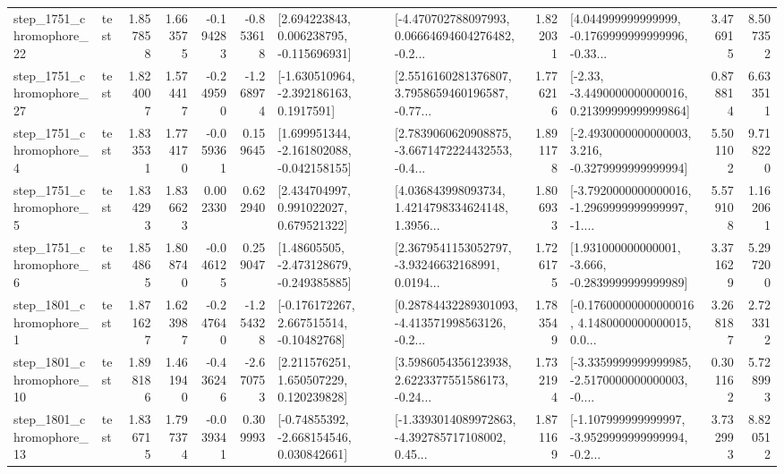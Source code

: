 \begin{tabular}{llrrrrllrlrr}
 step\_1751\_chromophore\_22 &      test &      1.857858 &    1.663575 &     -0.194283 & -0.853618 &    [2.694223843, 0.006238795, -0.115696931] &  [-4.470702788097993, 0.06664694604276482, -0.2... &       1.822031 &  [4.044999999999999, -0.1769999999999996, -0.33... &            3.476915 &          8.507352 \\
 step\_1751\_chromophore\_27 &      test &      1.824007 &    1.574417 &     -0.249590 & -1.268974 &     [-1.630510964, -2.392186163, 0.1917591] &  [2.5516160281376807, 3.7958659460196587, -0.77... &       1.776216 &  [-2.33, -3.4490000000000016, 0.21399999999999864] &            0.878814 &          6.633511 \\
  step\_1751\_chromophore\_4 &      test &      1.833531 &    1.774170 &     -0.059361 &  0.159645 &   [1.699951344, -2.161802088, -0.042158155] &  [2.7839060620908875, -3.6671472224432553, -0.4... &       1.891178 &  [-2.4930000000000003, 3.216, -0.3279999999999994] &            5.501102 &          9.718220 \\
  step\_1751\_chromophore\_5 &      test &      1.834293 &    1.836623 &      0.002330 &  0.622940 &     [2.434704997, 0.991022027, 0.679521322] &  [4.036843998093734, 1.4214798334624148, 1.3956... &       1.806933 &  [-3.7920000000000016, -1.2969999999999997, -1.... &            5.579108 &          1.162061 \\
  step\_1751\_chromophore\_6 &      test &      1.854865 &    1.808740 &     -0.046125 &  0.259047 &    [1.48605505, -2.473128679, -0.249385885] &  [2.3679541153052797, -3.93246632168991, 0.0194... &       1.726175 &   [1.931000000000001, -3.666, -0.2839999999999989] &            3.371629 &          5.297200 \\
  step\_1801\_chromophore\_1 &      test &      1.871627 &    1.623987 &     -0.247640 & -1.254328 &    [-0.176172267, 2.667515514, -0.10482768] &  [0.28784432289301093, -4.413571998563126, -0.2... &       1.783549 &  [-0.17600000000000016, 4.1480000000000015, 0.0... &            3.268187 &          2.723312 \\
 step\_1801\_chromophore\_10 &      test &      1.898186 &    1.461940 &     -0.436246 & -2.670753 &     [2.211576251, 1.650507229, 0.120239828] &  [3.5986054356123938, 2.6223377551586173, -0.24... &       1.732194 &  [-3.3359999999999985, -2.5170000000000003, -0.... &            0.301162 &          5.728993 \\
 step\_1801\_chromophore\_13 &      test &      1.836715 &    1.797374 &     -0.039341 &  0.309993 &    [-0.74855392, -2.668154546, 0.030842661] &  [-1.3393014089972863, -4.392785717108002, 0.45... &       1.871169 &  [-1.107999999999997, -3.9529999999999994, -0.2... &            3.732993 &          8.820512 \\

\end{tabular}

